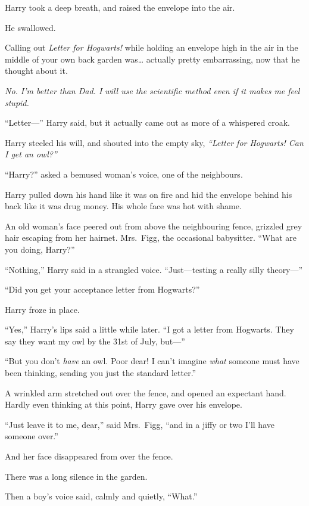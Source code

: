 Harry took a deep breath, and raised the envelope into the air.

He swallowed.

Calling out \emph{Letter for Hogwarts!} while holding an envelope high
in the air in the middle of your own back garden was\ldots{} actually
pretty embarrassing, now that he thought about it.

\emph{No. I'm better than Dad. I will use the scientific method even if
it makes me feel stupid.}

``Letter---'' Harry said, but it actually came out as more of a
whispered croak.

Harry steeled his will, and shouted into the empty sky, \emph{``Letter
for Hogwarts! Can I get an owl?''}

``Harry?'' asked a bemused woman's voice, one of the neighbours.

Harry pulled down his hand like it was on fire and hid the envelope
behind his back like it was drug money. His whole face was hot with
shame.

An old woman's face peered out from above the neighbouring fence,
grizzled grey hair escaping from her hairnet. Mrs.~Figg, the occasional
babysitter. ``What are you doing, Harry?''

``Nothing,'' Harry said in a strangled voice. ``Just---testing a really
silly theory---''

``Did you get your acceptance letter from Hogwarts?''

Harry froze in place.

``Yes,'' Harry's lips said a little while later. ``I got a letter from
Hogwarts. They say they want my owl by the 31st of July, but---''

``But you don't \emph{have} an owl. Poor dear! I can't imagine
\emph{what} someone must have been thinking, sending you just the
standard letter.''

A wrinkled arm stretched out over the fence, and opened an expectant
hand. Hardly even thinking at this point, Harry gave over his envelope.

``Just leave it to me, dear,'' said Mrs.~Figg, ``and in a jiffy or two
I'll have someone over.''

And her face disappeared from over the fence.

There was a long silence in the garden.

Then a boy's voice said, calmly and quietly, ``What.''
